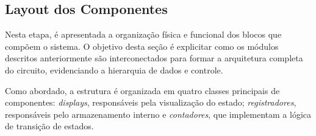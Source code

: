 \subsection{Layout dos Componentes}

Nesta etapa, é apresentada a organização física e funcional dos blocos que compõem o sistema. O objetivo desta seção é explicitar como os módulos descritos anteriormente são interconectados para formar a arquitetura completa do circuito, evidenciando a hierarquia de dados e controle.

Como abordado, a estrutura é organizada em quatro classes principais de componentes: \textit{displays}, responsáveis pela visualização do estado; \textit{registradores}, responsáveis pelo armazenamento interno e \textit{contadores}, que implementam a lógica de transição de estados.














